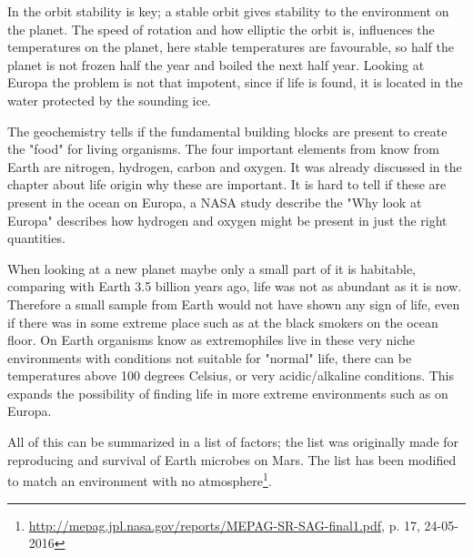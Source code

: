 In the orbit stability is key; a stable orbit gives stability to the environment on the planet. The speed of rotation and how elliptic the orbit is, influences the temperatures on the planet, here stable temperatures are favourable, so half the planet is not frozen half the year and boiled the next half year. Looking at Europa the problem is not that impotent, since if life is found, it is located in the water protected by the sounding ice.

The geochemistry tells if the fundamental building blocks are present to create the "food" for living organisms. The four important elements from know from Earth are nitrogen, hydrogen, carbon and oxygen. It was already discussed in the chapter about life origin why these are important.  It is hard to tell if these are present in the ocean on Europa, a NASA study describe the "Why look at Europa" describes how hydrogen and oxygen might be present in just the right quantities.

When looking at a new planet maybe only a small part of it is habitable, comparing with Earth 3.5 billion years ago, life was not as abundant as it is now. Therefore a small sample from Earth would not have shown any sign of life, even if there was in some extreme place such as at the black smokers on the ocean floor. On Earth organisms know as extremophiles live in these very niche environments with conditions not suitable for "normal" life, there can be temperatures above 100 degrees Celsius, or very acidic/alkaline conditions. This expands the possibility of finding life in more extreme environments such as on Europa.

All of this can be summarized in a list of factors; the list was originally made for reproducing and survival of Earth microbes on Mars. The list has been modified to match an environment with no atmosphere\footnote{\url{http://mepag.jpl.nasa.gov/reports/MEPAG-SR-SAG-final1.pdf}, p. 17, 24-05-2016}.

